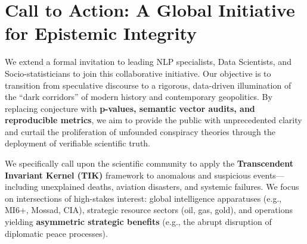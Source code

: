 \documentclass[11pt,a4paper]{article}
\theoremstyle{definition}
\theoremstyle{remark}
\begin{document}


\section*{Call to Action: A Global Initiative for Epistemic Integrity}

We extend a formal invitation to leading NLP specialists, Data Scientists, and Socio-statisticians to join this collaborative initiative. Our objective is to transition from speculative discourse to a rigorous, data-driven illumination of the ``dark corridors'' of modern history and contemporary geopolitics. By replacing conjecture with \textbf{p-values, semantic vector audits, and reproducible metrics}, we aim to provide the public with unprecedented clarity and curtail the proliferation of unfounded conspiracy theories through the deployment of verifiable scientific truth.

We specifically call upon the scientific community to apply the \textbf{Transcendent Invariant Kernel (TIK)} framework to anomalous and suspicious events—including unexplained deaths, aviation disasters, and systemic failures. We focus on intersections of high-stakes interest: global intelligence apparatuses (e.g., MI6+, Mossad, CIA), strategic resource sectors (oil, gas, gold), and operations yielding \textbf{asymmetric strategic benefits} (e.g., the abrupt disruption of diplomatic peace processes). 
\end{document}
